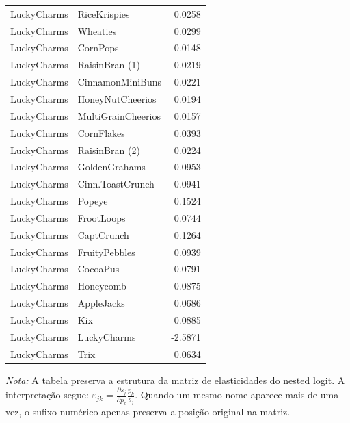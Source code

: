 \begin{table}[H]
\begin{tabular}{llr}
LuckyCharms & RiceKrispies & 0.0258 \\
LuckyCharms & Wheaties & 0.0299 \\
LuckyCharms & CornPops & 0.0148 \\
LuckyCharms & RaisinBran (1) & 0.0219 \\
LuckyCharms & CinnamonMiniBuns & 0.0221 \\
LuckyCharms & HoneyNutCheerios & 0.0194 \\
LuckyCharms & MultiGrainCheerios & 0.0157 \\
LuckyCharms & CornFlakes & 0.0393 \\
LuckyCharms & RaisinBran (2) & 0.0224 \\
LuckyCharms & GoldenGrahams & 0.0953 \\
LuckyCharms & Cinn.ToastCrunch & 0.0941 \\
LuckyCharms & Popeye & 0.1524 \\
LuckyCharms & FrootLoops & 0.0744 \\
LuckyCharms & CaptCrunch & 0.1264 \\
LuckyCharms & FruityPebbles & 0.0939 \\
LuckyCharms & CocoaPus & 0.0791 \\
LuckyCharms & Honeycomb & 0.0875 \\
LuckyCharms & AppleJacks & 0.0686 \\
LuckyCharms & Kix & 0.0885 \\
LuckyCharms & LuckyCharms & -2.5871 \\
LuckyCharms & Trix & 0.0634 \\
\bottomrule
\end{tabular}

\vspace{0.3em}
\footnotesize
\textit{Nota:} A tabela preserva a estrutura da matriz de elasticidades do nested logit. A interpretação segue: $\varepsilon_{jk}=\frac{\partial s_j}{\partial p_k}\frac{p_k}{s_j}$. Quando um mesmo nome aparece mais de uma vez, o sufixo numérico apenas preserva a posição original na matriz.
\end{table}
\endgroup


